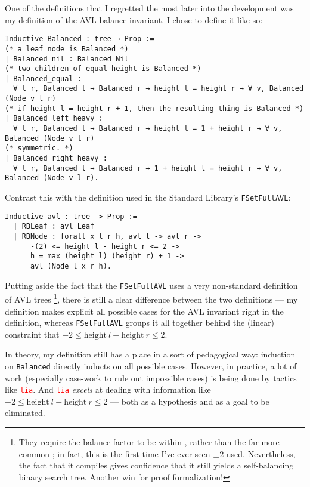 \documentclass[acmsmall, authorversion, nonacm, overload]{acmart}
\begin{document}
One of the definitions that I regretted the most later into the development
was my definition of the AVL balance invariant.
I chose to define it like so:
\begin{verbatim}
Inductive Balanced : tree → Prop :=
(* a leaf node is Balanced *)
| Balanced_nil : Balanced Nil
(* two children of equal height is Balanced *)
| Balanced_equal :
  ∀ l r, Balanced l → Balanced r → height l = height r → ∀ v, Balanced (Node v l r)
(* if height l = height r + 1, then the resulting thing is Balanced *)
| Balanced_left_heavy :
  ∀ l r, Balanced l → Balanced r → height l = 1 + height r → ∀ v, Balanced (Node v l r)
(* symmetric. *)
| Balanced_right_heavy :
  ∀ l r, Balanced l → Balanced r → 1 + height l = height r → ∀ v, Balanced (Node v l r).
\end{verbatim}
Contrast this with the definition used in the Standard Library's \verb|FSetFullAVL|:
\begin{verbatim}
Inductive avl : tree -> Prop :=
  | RBLeaf : avl Leaf
  | RBNode : forall x l r h, avl l -> avl r ->
      -(2) <= height l - height r <= 2 ->
      h = max (height l) (height r) + 1 ->
      avl (Node l x r h).
\end{verbatim}
Putting aside the fact that the \verb|FSetFullAVL| uses a very non-standard definition of AVL trees
\footnote{They require the balance factor to be within , rather than the far more common ;
  in fact, this is the first time I've ever seen $\pm 2$ used. Nevertheless, the fact that it compiles
  gives confidence that it still yields a self-balancing binary search tree. Another win for proof formalization!},
there is still a clear difference between the two definitions ---
my definition makes explicit all possible cases for the AVL invariant right in the definition,
whereas \verb|FSetFullAVL| groups it all together behind the (linear) constraint that
$-2 \le \mathrm{height}\ l - \mathrm{height}\ r \le 2$.

In theory, my definition still has a place in a sort of pedagogical way:
induction on \verb|Balanced| directly inducts on all possible cases.
However, in practice, a lot of work (especially case-work to rule out impossible cases)
is being done by tactics like \texttt{\textcolor{red}{lia}}.
And \texttt{\textcolor{red}{lia}} \emph{excels} at dealing with
information like $-2 \le \mathrm{height}\ l - \mathrm{height}\ r \le 2$ ---
both as a hypothesis and as a goal to be eliminated.
\end{document}
